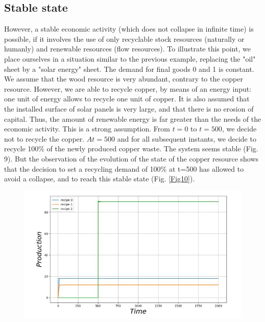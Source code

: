\documentclass[12pt,a4paper]{article}%
\begin{document}
\begin{appendix}
\subsection{Stable state}
However, a stable economic activity (which does not collapse in infinite time) is possible, if it involves the use of only recyclable stock resources (naturally or humanly) and renewable resources (flow resources).  To illustrate this point, we place ourselves in a situation similar to the previous example, replacing the "oil" sheet by a "solar energy" sheet. The demand for final goods 0 and 1 is constant. We assume that the wood resource is very abundant, contrary to the copper resource. However, we are able to recycle copper, by means of an energy input: one unit of energy allows to recycle one unit of copper.  It is also assumed that the installed surface of solar panels is very large, and that there is no erosion of capital. Thus, the amount of renewable energy is far greater than the needs of the economic activity. This is a strong assumption.  From $t=0$ to $t=500$, we decide not to recycle the copper. $At=500$ and for all subsequent instants, we decide to recycle 100\% of the newly produced copper waste.  The system seems stable (Fig. 9). But the observation of the evolution of the state of the copper resource shows that the decision to set a recycling demand of 100\% at t=500 has allowed to avoid a collapse, and to reach this stable state (Fig. \ref{Fig10}).  
\begin{figure}[h] 
	\centering 
	\includegraphics[width=1.0\textwidth]{figures/Production9.jpg}
	\label{Fig9}
\end{figure} 
\begin{figure}[h] 
	\centering 

\end{figure}
\end{appendix}
\end{document}
